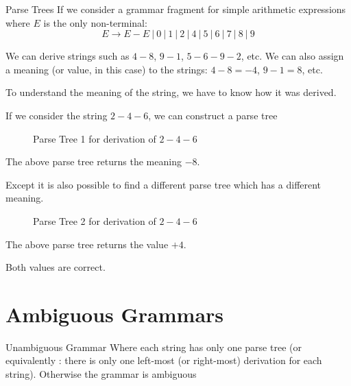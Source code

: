 \begin{example}{Parse Trees}
If we consider a grammar fragment for simple arithmetic expressions where $E$ is the only non-terminal:
\[E \rightarrow E - E\ |\ 0\ |\ 1\ |\ 2\ |\ 4\ |\ 5\ |\ 6\ |\ 7\ |\ 8\ |\ 9\]

We can derive strings such as $4-8$, $9-1$, $5-6-9-2$, etc. We can also assign a meaning (or value, in this case) to the strings: $4-8=-4$, $9-1=8$, etc. 

To understand the meaning of the string, we have to know how it was derived.

If we consider the string $2-4-6$, we can construct a parse tree
\begin{figure}[H]
\centering
{}
\caption{Parse Tree 1 for derivation of $2-4-6$}
\end{figure}

The above parse tree returns the meaning $-8$.

Except it is also possible to find a different parse tree which has a different meaning.

\begin{figure}[H]
\centering
{}
\caption{Parse Tree 2 for derivation of $2-4-6$}
\label{fig:top-down-parse-eg1}
\end{figure}

The above parse tree returns the value $+4$.

Both values are correct. 
\end{example}

\section{Ambiguous Grammars}
\begin{define}
\item[Unambiguous Grammar] Where each string has only one parse tree (or equivalently : there is only one left-most (or right-most) derivation for each string). Otherwise the grammar is ambiguous
\end{define}

